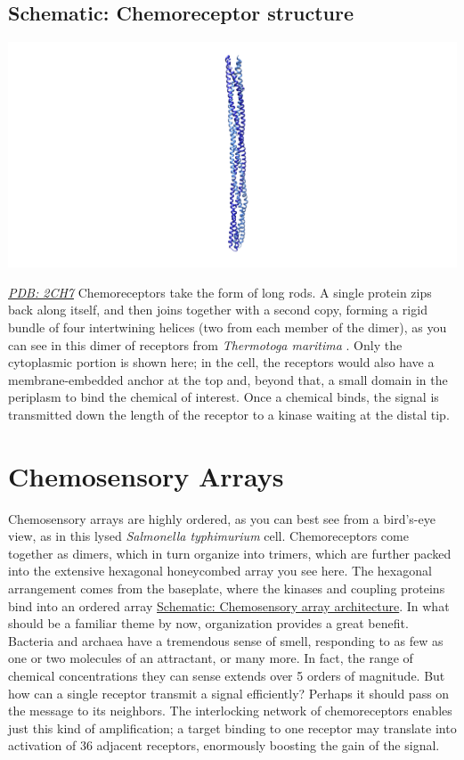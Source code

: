 \documentclass[]{tufte-book}
\begin{document}
\hypertarget{Chemoreceptor_structure}{\subsection*{Schematic:
Chemoreceptor structure}\label{Chemoreceptor_structure}}

\includegraphics{img/schematics/7_1_1}

\href{http://rcsb.org/structure/2CH7}{\emph{PDB: 2CH7}} Chemoreceptors
take the form of long rods. A single protein zips back along itself, and
then joins together with a second copy, forming a rigid bundle of four
intertwining helices (two from each member of the dimer), as you can see
in this dimer of receptors from \emph{Thermotoga maritima}
\citep{park2006}. Only the cytoplasmic portion is shown here; in the
cell, the receptors would also have a membrane-embedded anchor at the
top and, beyond that, a small domain in the periplasm to bind the
chemical of interest. Once a chemical binds, the signal is transmitted
down the length of the receptor to a kinase waiting at the distal tip.

\section{Chemosensory Arrays}\label{chemosensory-arrays}

Chemosensory arrays are highly ordered, as you can best see from a
bird's-eye view, as in this lysed \emph{Salmonella typhimurium} cell.
Chemoreceptors come together as dimers, which in turn organize into
trimers, which are further packed into the extensive hexagonal
honeycombed array you see here. The hexagonal arrangement comes from the
baseplate, where the kinases and coupling proteins bind into an ordered
array \protect\hyperlink{Chemosensory_array_architecture}{Schematic:
Chemosensory array architecture}. In what should be a familiar theme by
now, organization provides a great benefit. Bacteria and archaea have a
tremendous sense of smell, responding to as few as one or two molecules
of an attractant, or many more. In fact, the range of chemical
concentrations they can sense extends over 5 orders of magnitude. But
how can a single receptor transmit a signal efficiently? Perhaps it
should pass on the message to its neighbors. The interlocking network of
chemoreceptors enables just this kind of amplification; a target binding
to one receptor may translate into activation of 36 adjacent receptors,
enormously boosting the gain of the signal.
\end{document}
